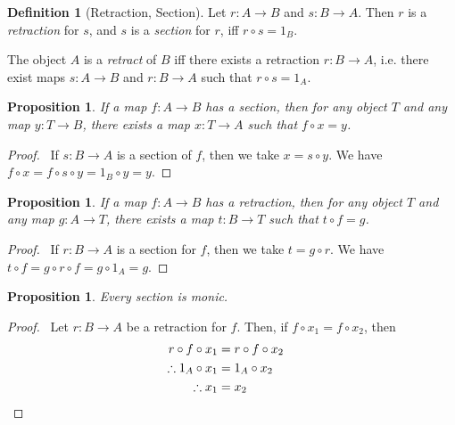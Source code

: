 \documentclass{article}
\let\qed\relax
\newtheorem{proposition}[axiom]{Proposition}
\theoremstyle{definition}
\newtheorem{definition}[axiom]{Definition}
\begin{document}
\begin{definition}[Retraction, Section]
    Let $r : A \rightarrow B$ and $s : B \rightarrow A$. Then $r$ is a \emph{retraction} for $s$, and $s$ is a
    \emph{section} for $r$, iff $r \circ s = 1_B$.

    The object $A$ is a \emph{retract} of $B$ iff there exists a retraction $r : B \rightarrow A$,
    i.e. there exist maps $s : A \rightarrow B$ and $r : B \rightarrow A$ such that $r \circ s = 1_A$.
\end{definition}

\begin{proposition}
    If a map $f : A \rightarrow B$ has a section, then for any object $T$ and any map $y : T \rightarrow B$,
    there exists a map $x : T \rightarrow A$ such that $f \circ x = y$.
\end{proposition}

\begin{proof}
    \pf\ If $s : B \rightarrow A$ is a section of $f$, then we take $x = s \circ y$. We have
    $f \circ x = f \circ s \circ y = 1_B \circ y = y$. \qed
\end{proof}

\begin{proposition}
    If a map $f : A \rightarrow B$ has a retraction, then for any object $T$ and any map $g : A \rightarrow T$,
    there exists a map $t : B \rightarrow T$ such that $t \circ f = g$.
\end{proposition}

\begin{proof}
    \pf\ If $r : B \rightarrow A$ is a section for $f$, then we take $t = g \circ r$. We have
    $t \circ f = g \circ r \circ f = g \circ 1_A = g$. \qed
\end{proof}

\begin{proposition}
    Every section is monic.
\end{proposition}

\begin{proof}
    \pf\ Let $r : B \rightarrow A$ be a retraction for $f$. Then, if $f \circ x_1 = f \circ x_2$, then
    \begin{align*}
        r \circ f \circ x_1 & = r \circ f \circ x_2 \\
        \therefore 1_A \circ x_1 & = 1_A \circ x_2 \\
        \therefore x_1 & = x_2 & \qed
    \end{align*}
\end{proof}
\end{document}
